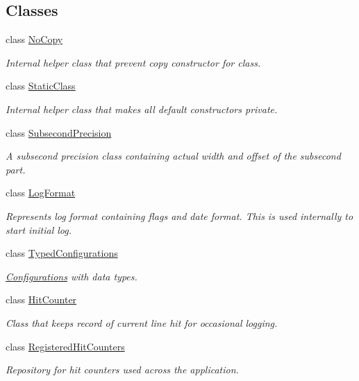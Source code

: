 \subsection*{Classes}
\begin{DoxyCompactItemize}
\item 
class \hyperlink{classel_1_1base_1_1NoCopy}{No\-Copy}
\begin{DoxyCompactList}\small\item\em Internal helper class that prevent copy constructor for class. \end{DoxyCompactList}\item 
class \hyperlink{classel_1_1base_1_1StaticClass}{Static\-Class}
\begin{DoxyCompactList}\small\item\em Internal helper class that makes all default constructors private. \end{DoxyCompactList}\item 
class \hyperlink{classel_1_1base_1_1SubsecondPrecision}{Subsecond\-Precision}
\begin{DoxyCompactList}\small\item\em A subsecond precision class containing actual width and offset of the subsecond part. \end{DoxyCompactList}\item 
class \hyperlink{classel_1_1base_1_1LogFormat}{Log\-Format}
\begin{DoxyCompactList}\small\item\em Represents log format containing flags and date format. This is used internally to start initial log. \end{DoxyCompactList}\item 
class \hyperlink{classel_1_1base_1_1TypedConfigurations}{Typed\-Configurations}
\begin{DoxyCompactList}\small\item\em \hyperlink{classel_1_1Configurations}{Configurations} with data types. \end{DoxyCompactList}\item 
class \hyperlink{classel_1_1base_1_1HitCounter}{Hit\-Counter}
\begin{DoxyCompactList}\small\item\em Class that keeps record of current line hit for occasional logging. \end{DoxyCompactList}\item 
class \hyperlink{classel_1_1base_1_1RegisteredHitCounters}{Registered\-Hit\-Counters}
\begin{DoxyCompactList}\small\item\em Repository for hit counters used across the application. \end{DoxyCompactList}\item 

\end{DoxyCompactItemize}
